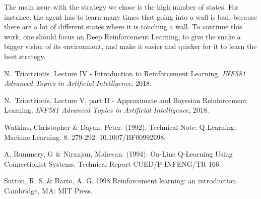 \documentclass[journal, a4paper]{IEEEtran}
\begin{document}
    The main issue with the strategy we chose is the high number of states.
    For instance, the agent has to learn many times that going into a wall is bad, because there are a lot of different states where it is touching a wall.
    To continue this work, one should focus on Deep Reinforcement Learning, to give the snake a bigger vision of its environment, and make it easier and quicker for it to learn the best strategy.

\begin{thebibliography}{4}

	N.~Tziortziotis. Lecture IV - Introduction to Reinforcement Learning. \textit{INF581 Advanced Topics in Artificial Intelligence}, 2018.

	N.~Tziortziotis. Lecture V, part II - Approximate and Bayesian Reinforcement Learning. \textit{INF581 Advanced Topics in Artificial Intelligence}, 2018.

	Watkins, Christopher \& Dayan, Peter. (1992). Technical Note: Q-Learning. Machine Learning. 8. 279-292. 10.1007/BF00992698. 

	A. Rummery, G \& Niranjan, Mahesan. (1994). On-Line Q-Learning Using Connectionist Systems. Technical Report CUED/F-INFENG/TR 166. 

    Sutton, R. S. \& Barto, A. G. 1998 Reinforcement learning: an introduction. Cambridge, MA: MIT Press.

\end{thebibliography}
\end{document}
